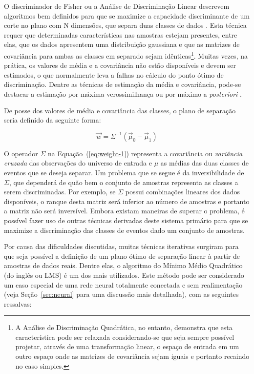 O discriminador de Fisher \cite{fisher} ou a Análise de Discriminação Linear
descrevem algoritmos bem definidos para que se maximize a capacidade
discriminante de um corte no plano com N dimensões, que separa duas classes de
dados \cite{duda}. Esta técnica requer que determinadas características nas
amostras estejam presentes, entre elas, que os dados apresentem uma
distribuição gaussiana e que as matrizes de covariância para ambas as classes
em separado sejam idênticas\footnote{A Análise de Discriminação Quadrática, no
entanto, demonstra que esta característica pode ser relaxada considerando-se
que seja sempre possível projetar, através de uma transformação linear, o
espaço de entrada em um outro espaço onde as matrizes de covariância sejam
iguais e portanto recaindo no caso simples.}. Muitas vezes, na prática, os
valores de média e a covariância não estão disponíveis e devem ser estimados,
o que normalmente leva a falhas no cálculo do ponto ótimo de
discriminação. Dentre as técnicas de estimação da média e covariância, pode-se
destacar a estimação por máxima verossimilhança ou por máximo a
\textit{posteriori} \cite{duda}.

De posse dos valores de média e covariância das classes, o plano de separação
seria definido da seguinte forma:

\begin{equation}
\overrightarrow{w} = \Sigma^{-1}(\overrightarrow{\mu}_0 -
\overrightarrow{\mu}_1) 
\label{eq:weight-1}
\end{equation}

O operador $\Sigma$ na Equação~(\ref{eq:weight-1}) representa a covariância ou
\textit{variância cruzada} das observações do universo de entrada e $\mu$ as
médias das duas classes de eventos que se deseja separar. Um problema que se
segue é da inversibilidade de $\Sigma$, que dependerá de quão bem o conjunto
de amostras representa as classes a serem discriminadas. Por exemplo, se
$\Sigma$ possui combinações lineares dos dados disponíveis, o ranque desta
matriz será inferior ao número de amostras e portanto a matriz não será
inversível. Embora existam maneiras de superar o problema, é possível fazer
uso de outras técnicas derivadas deste sistema primário para que se maximize a
discriminação das classes de eventos dado um conjunto de amostras.

Por causa das dificuldades discutidas, muitas técnicas iterativas surgiram
para que seja possível a definição de um plano ótimo de separação linear à
partir de amostras de dados reais. Dentre elas, o algoritmo do Mínimo Médio
Quadrático \cite{widrow} (do inglês  ou LMS) é um dos
mais utilizados. Este método pode ser considerado um caso especial de uma rede
neural totalmente conectada e sem realimentação (veja Seção~\ref{sec:neural}
para uma discussão mais detalhada), com as seguintes ressalvas:


